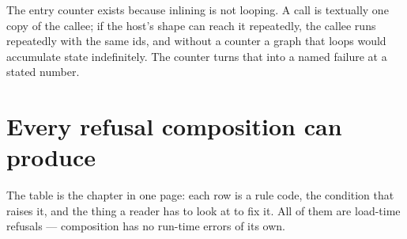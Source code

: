 The entry counter exists because inlining is not looping. A call is textually one copy of the
callee; if the host's shape can reach it repeatedly, the callee runs repeatedly with the same ids,
and without a counter a graph that loops would accumulate state indefinitely. The counter turns
that into a named failure at a stated number.

\section{Every refusal composition can produce}

The table is the chapter in one page: each row is a rule code, the condition that raises it, and the
thing a reader has to look at to fix it. All of them are load-time refusals --- composition has no
run-time errors of its own.

